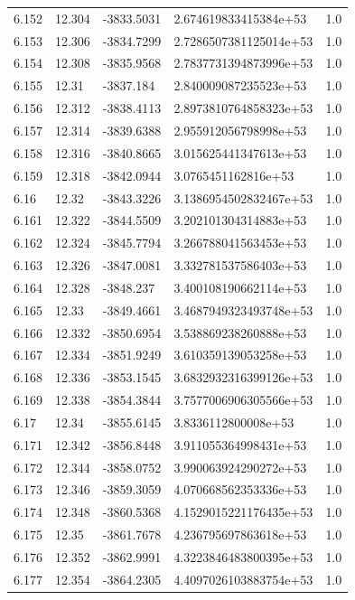 \begin{tabular}{lllll}
6.152 & 12.304 & -3833.5031 & 2.674619833415384e+53 & 1.0 \\
6.153 & 12.306 & -3834.7299 & 2.7286507381125014e+53 & 1.0 \\
6.154 & 12.308 & -3835.9568 & 2.7837731394873996e+53 & 1.0 \\
6.155 & 12.31 & -3837.184 & 2.840009087235523e+53 & 1.0 \\
6.156 & 12.312 & -3838.4113 & 2.8973810764858323e+53 & 1.0 \\
6.157 & 12.314 & -3839.6388 & 2.955912056798998e+53 & 1.0 \\
6.158 & 12.316 & -3840.8665 & 3.015625441347613e+53 & 1.0 \\
6.159 & 12.318 & -3842.0944 & 3.0765451162816e+53 & 1.0 \\
6.16 & 12.32 & -3843.3226 & 3.1386954502832467e+53 & 1.0 \\
6.161 & 12.322 & -3844.5509 & 3.202101304314883e+53 & 1.0 \\
6.162 & 12.324 & -3845.7794 & 3.266788041563453e+53 & 1.0 \\
6.163 & 12.326 & -3847.0081 & 3.332781537586403e+53 & 1.0 \\
6.164 & 12.328 & -3848.237 & 3.400108190662114e+53 & 1.0 \\
6.165 & 12.33 & -3849.4661 & 3.4687949323493748e+53 & 1.0 \\
6.166 & 12.332 & -3850.6954 & 3.538869238260888e+53 & 1.0 \\
6.167 & 12.334 & -3851.9249 & 3.610359139053258e+53 & 1.0 \\
6.168 & 12.336 & -3853.1545 & 3.6832932316399126e+53 & 1.0 \\
6.169 & 12.338 & -3854.3844 & 3.7577006906305566e+53 & 1.0 \\
6.17 & 12.34 & -3855.6145 & 3.8336112800008e+53 & 1.0 \\
6.171 & 12.342 & -3856.8448 & 3.911055364998431e+53 & 1.0 \\
6.172 & 12.344 & -3858.0752 & 3.990063924290272e+53 & 1.0 \\
6.173 & 12.346 & -3859.3059 & 4.070668562353336e+53 & 1.0 \\
6.174 & 12.348 & -3860.5368 & 4.1529015221176435e+53 & 1.0 \\
6.175 & 12.35 & -3861.7678 & 4.236795697863618e+53 & 1.0 \\
6.176 & 12.352 & -3862.9991 & 4.3223846483800395e+53 & 1.0 \\
6.177 & 12.354 & -3864.2305 & 4.4097026103883754e+53 & 1.0 \\

\end{tabular}
